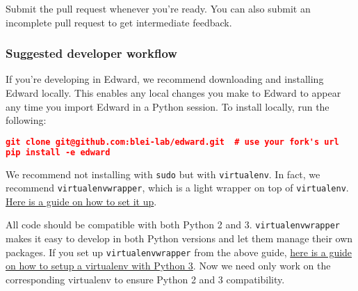 Submit the pull request whenever you're ready. You can also submit an
incomplete pull request to get intermediate feedback.

\subsubsection{Suggested developer workflow}\label{suggested-workflow}

If you're developing in Edward,
we recommend downloading and installing Edward locally. This enables
any local changes you make to Edward to appear any time you
import Edward in a Python session. To install locally, run the
following:

\begin{lstlisting}[language=JSON]
git clone git@github.com:blei-lab/edward.git  # use your fork's url
pip install -e edward
\end{lstlisting}

We recommend not installing with \texttt{sudo} but with
\texttt{virtualenv}. In fact, we recommend
\texttt{virtualenvwrapper}, which is a light wrapper on top of
\texttt{virtualenv}.
\href{http://docs.python-guide.org/en/latest/starting/install/osx/}
{Here is a guide on how to set it up}.

All code should be compatible with both Python 2 and 3.
\texttt{virtualenvwrapper} makes it easy to develop in both Python versions
and let them manage their own packages.
If you set up \texttt{virtualenvwrapper} from the above guide,
\href{http://www.marinamele.com/2014/07/install-python3-on-mac-os-x-and-use-virtualenv-and-virtualenvwrapper.html}
{here is a guide on how to setup a virtualenv with Python 3}.
Now we need only work on the corresponding virtualenv to ensure Python
2 and 3 compatibility.
